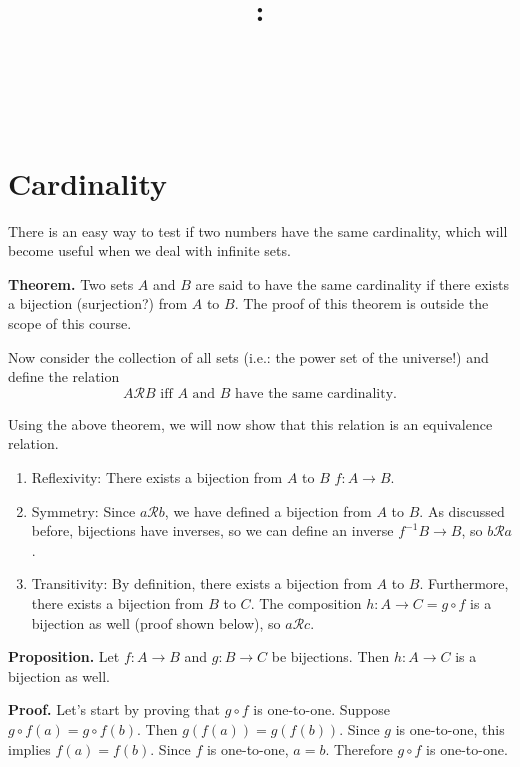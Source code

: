 \documentclass{article}
\title{
    \vspace{2in}
    \textbf{\lectClass:\\ \lectTitle}\\
    \vspace{0.1in}\large{\textit{\lectClassInstructor\ \lectSection}}
    \vspace{3in}
    \author{\textbf{\lectAuthorName}}
    \date{}
}
\begin{document}
\maketitle
\pagebreak

\section*{Cardinality}
    
    There is an easy way to test if two numbers have the same cardinality, which will become useful when we deal with infinite sets.
    
    \vspace{1.5mm}
    \textbf{Theorem.} Two sets $A$ and $B$ are said to have the same cardinality if there exists a bijection (surjection?) from $A$ to $B$. The proof of this theorem is outside the scope of this course.
    
    \vspace{1.5mm}
    Now consider the collection of all sets (i.e.: the power set of the universe!) and define the relation
    $$A \mathcal{R }B \text{ iff $A$ and $B$ have the same cardinality.}$$
    
    Using the above theorem, we will now show that this relation is an equivalence relation.
    
    \begin{enumerate}[label = \arabic*.]
        \item Reflexivity: There exists a bijection from $A$ to $B$ $f: A \rightarrow B$.
        \item Symmetry: Since $a\mathcal{R}b$, we have defined a bijection from $A$ to $B$. As discussed before, bijections have inverses, so we can define an inverse $f^{-1} B \rightarrow B$, so $b \mathcal{R} a$.
        \item Transitivity: By definition, there exists a bijection from $A$ to $B$. Furthermore, there exists a bijection from $B$ to $C$. The composition $h: A \rightarrow C = g \circ f$ is a bijection as well (proof shown below), so $a \mathcal{R} c$.
    \end{enumerate}
    
    \vspace{1.5mm}
    \textbf{Proposition.}
    Let $f: A \rightarrow B$ and $g: B \rightarrow C$ be bijections. Then $h: A \rightarrow C$ is a bijection as well.
    
    \textbf{Proof.}
    Let’s start by proving that $g \circ f$ is one-to-one. Suppose $g \circ f(a) = g \circ f(b)$. Then $g(f(a)) = g(f(b))$. Since $g$ is one-to-one, this implies $f(a) = f(b)$. Since $f$ is one-to-one, $a = b$. Therefore $g \circ f$ is one-to-one. 
    \vspace{1.5mm}
    
\end{document}

